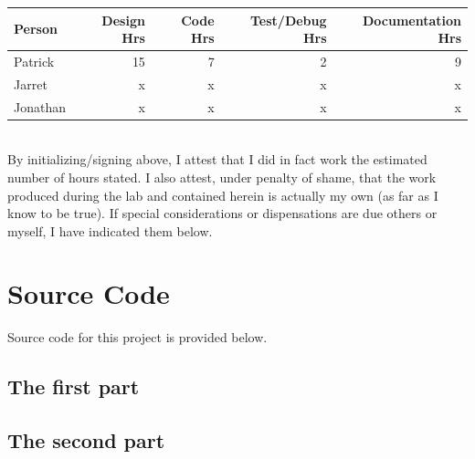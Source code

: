 \documentclass[12pt]{article} %
\begin{document}
\begin{tabular}{|l|*{4}{r|}}
	\hline
	Person & Design Hrs & Code Hrs & Test/Debug Hrs & Documentation Hrs \\ \hline
	Patrick & 15 & 7 & 2 & 9  \\ \hline
	Jarret & x & x & x & x  \\ \hline
	Jonathan & x & x & x & x  \\ \hline
\end{tabular}

~\\

By initializing/signing above, I attest that I did in fact work the estimated number of hours stated. I also attest, under penalty of shame, that the work produced during the lab and contained herein is actually my own (as far as I know to be true). If special considerations or dispensations are due others or myself, I have indicated them below.

\pagebreak

\section{Source Code}

Source code for this project is provided below.

\subsection{The first part}
% 

\subsection{The second part}
% 
\end{document}
